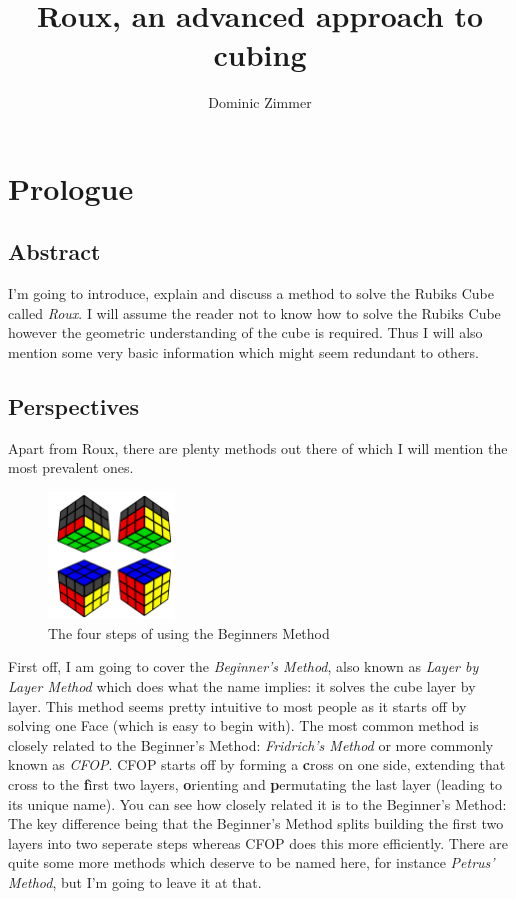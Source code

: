\documentclass{scrreprt}
\begin{document}
\title{Roux, an advanced approach to cubing}
\author{Dominic Zimmer}
\maketitle 

\tableofcontents
\chapter{Prologue}

\section{Abstract}
I'm going to introduce, explain and discuss a method to solve the Rubiks Cube called \emph{Roux}. I will assume the reader not to know how to solve the Rubiks Cube however the geometric understanding of the cube is required. Thus I will also mention some very basic information which might seem redundant to others.

\section{Perspectives}
Apart from Roux, there are plenty methods out there of which I will mention the most prevalent ones.

\begin{figure}
\centering
\includegraphics[width=0.3\textwidth]{union.png}
\caption*{The four steps of using the Beginners Method}
\end{figure}
First off, I am going to cover the \emph{Beginner's Method}, also known as \emph{Layer by Layer Method} which does what the name implies: it solves the cube layer by layer. This method seems pretty intuitive to most people as it starts off by solving one Face (which is easy to begin with). The most common method is closely related to the Beginner's Method: \emph{Fridrich's Method} or more commonly known as \emph{CFOP}. CFOP starts off by forming a \textbf{c}ross on one side, extending that cross to the \textbf{f}irst two layers, \textbf{o}rienting and \textbf{p}ermutating the last layer (leading to its unique name). You can see how closely related it is to the Beginner's Method: The key difference being that the Beginner's Method splits building the first two layers into two seperate steps whereas CFOP does this more efficiently. There are quite some more methods which deserve to be named here, for instance \emph{Petrus' Method}, but I'm going to leave it at that.
\end{document}
